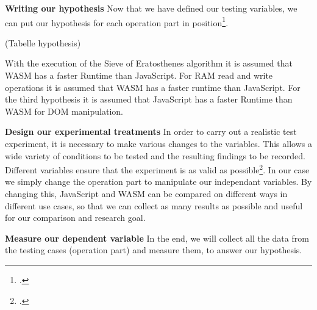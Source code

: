 \textbf{Writing our hypothesis} \newline
Now that we have defined our testing variables, we can put our hypothesis for each operation part in position\footcite{bevans_guide_2019}.

(Tabelle hypothesis)

With the execution of the Sieve of Eratosthenes algorithm it is assumed that WASM has a faster Runtime than JavaScript.
For RAM read and write operations it is assumed that WASM has a faster runtime than JavaScript.
For the third hypothesis it is assumed that JavaScript has a faster Runtime than WASM for DOM manipulation.

\textbf{Design our experimental treatments} \newline
In order to carry out a realistic test experiment, it is necessary to make various changes to the variables. This allows a wide variety of conditions to be tested and the resulting findings to be recorded. Different variables ensure that the experiment is as valid as possible\footcite{bevans_guide_2019}.
In our case we simply change the operation part to manipulate our independant variables. By changing this, JavaScript and WASM can be compared on different ways in different use cases, so that we can collect as many results as possible and useful for our comparison and research goal.

\textbf{Measure our dependent variable} \newline
In the end, we will collect all the data from the testing cases (operation part) and measure them, to answer our hypothesis.
